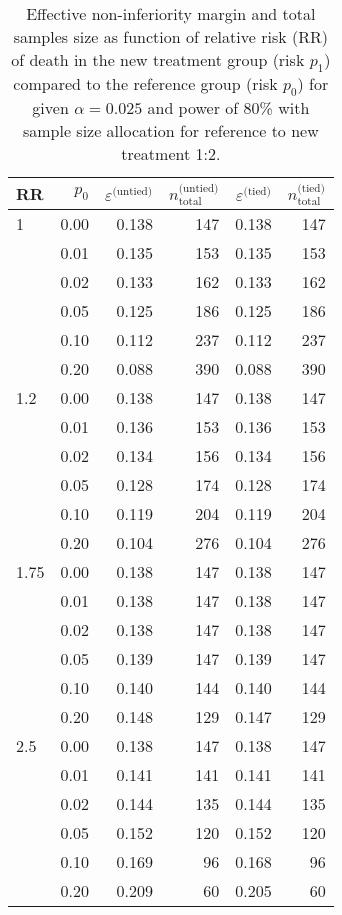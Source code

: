 \documentclass[bimj,fleqn]{w-art}\usepackage[]{graphicx}\usepackage[]{color}
\theoremstyle{plain}
\theoremstyle{definition}
\begin{document}
\begin{table}[ht]
\centering
\caption{Effective non-inferiority margin and total samples size as function of relative risk (RR) of death in the new treatment group (risk $p_1$) compared to the reference group (risk $p_0$) for given $\alpha =0.025$ and power of 80\% with sample size allocation for reference to new treatment 1:2.} 
\label{tab:test}
\begin{tabular}{lrrrrr}
  \hline
RR & $p_0$ & $\varepsilon^{\text{(untied)}}$ & $n^{\text{(untied)}}_{\text{total}}$ & $\varepsilon^{\text{(tied)}}$ & $n^{\text{(tied)}}_{\text{total}}$ \\ 
  \hline
1 & 0.00 & 0.138 & 147 & 0.138 & 147 \\ 
    & 0.01 & 0.135 & 153 & 0.135 & 153 \\ 
    & 0.02 & 0.133 & 162 & 0.133 & 162 \\ 
    & 0.05 & 0.125 & 186 & 0.125 & 186 \\ 
    & 0.10 & 0.112 & 237 & 0.112 & 237 \\ 
    & 0.20 & 0.088 & 390 & 0.088 & 390 \\ 
  1.2 & 0.00 & 0.138 & 147 & 0.138 & 147 \\ 
    & 0.01 & 0.136 & 153 & 0.136 & 153 \\ 
    & 0.02 & 0.134 & 156 & 0.134 & 156 \\ 
    & 0.05 & 0.128 & 174 & 0.128 & 174 \\ 
    & 0.10 & 0.119 & 204 & 0.119 & 204 \\ 
    & 0.20 & 0.104 & 276 & 0.104 & 276 \\ 
  1.75 & 0.00 & 0.138 & 147 & 0.138 & 147 \\ 
    & 0.01 & 0.138 & 147 & 0.138 & 147 \\ 
    & 0.02 & 0.138 & 147 & 0.138 & 147 \\ 
    & 0.05 & 0.139 & 147 & 0.139 & 147 \\ 
    & 0.10 & 0.140 & 144 & 0.140 & 144 \\ 
    & 0.20 & 0.148 & 129 & 0.147 & 129 \\ 
  2.5 & 0.00 & 0.138 & 147 & 0.138 & 147 \\ 
    & 0.01 & 0.141 & 141 & 0.141 & 141 \\ 
    & 0.02 & 0.144 & 135 & 0.144 & 135 \\ 
    & 0.05 & 0.152 & 120 & 0.152 & 120 \\ 
    & 0.10 & 0.169 & 96 & 0.168 & 96 \\ 
    & 0.20 & 0.209 & 60 & 0.205 & 60 \\ 
   \hline
\end{tabular}
\end{table}
\end{document}
